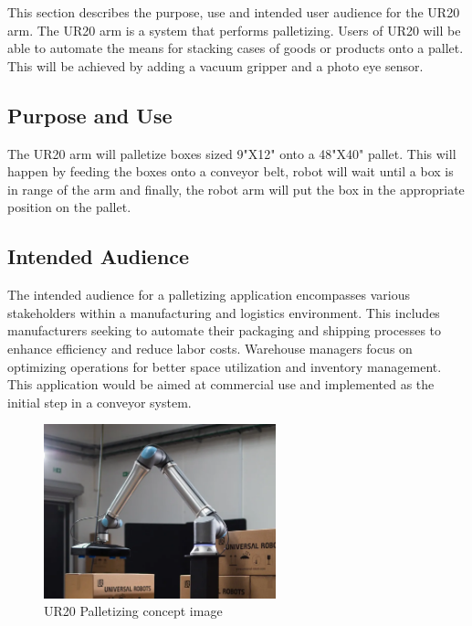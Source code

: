 This section describes the purpose, use and intended user audience for the UR20 arm. The UR20 arm is a system that performs palletizing. Users of UR20 will be able to automate the means for stacking cases of goods or products onto a pallet. This will be achieved by adding a vacuum gripper and a photo eye sensor.

\subsection{Purpose and Use}
The UR20 arm will palletize boxes sized 9"X12" onto a 48"X40" pallet. This will happen by feeding the boxes onto a conveyor belt, robot will wait until a box is in range of the arm and finally, the robot arm will put the box in the appropriate position on the pallet.


\subsection{Intended Audience}
The intended audience for a palletizing application encompasses various stakeholders within a manufacturing and logistics environment. This includes manufacturers seeking to automate their packaging and shipping processes to enhance efficiency and reduce labor costs. Warehouse managers focus on optimizing operations for better space utilization and inventory management. This application would be aimed at commercial use and implemented as the initial step in a conveyor system.
\begin{figure}[h!]
	\centering
   	\includegraphics[width=0.60\textwidth]{images/UR20}
    \caption{UR20 Palletizing concept image}
\end{figure}